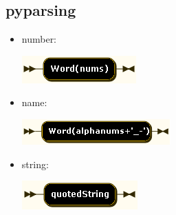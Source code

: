 \documentclass[a4paper,11pt,notitlepage]{article}
\begin{document}
\subsection{pyparsing}
\begin{itemize}
\item number:

\includegraphics[scale=0.66]{images/grammar/number.png}

\item name:

\includegraphics[scale=0.66]{images/grammar/name.png}

\item string:

\includegraphics[scale=0.66]{images/grammar/string.png}
\end{itemize}
\end{document}
